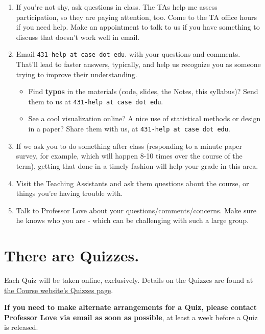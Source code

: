 \documentclass[
]{book}
\providecommand{\tightlist}{%
  \setlength{\itemsep}{0pt}\setlength{\parskip}{0pt}}
\begin{document}
\begin{enumerate}
\def\labelenumi{\arabic{enumi}.}
\tightlist
\item
  If you're not shy, ask questions in class. The TAs help me assess participation, so they are paying attention, too. Come to the TA office hours if you need help. Make an appointment to talk to us if you have something to discuss that doesn't work well in email.
\item
  Email \texttt{431-help\ at\ case\ dot\ edu}. with your questions and comments. That'll lead to faster answers, typically, and help us recognize you as someone trying to improve their understanding.

  \begin{itemize}
  \tightlist
  \item
    Find \textbf{typos} in the materials (code, slides, the Notes, this syllabus)? Send them to us at \texttt{431-help\ at\ case\ dot\ edu}.
  \item
    See a cool visualization online? A nice use of statistical methods or design in a paper? Share them with us, at \texttt{431-help\ at\ case\ dot\ edu}.
  \end{itemize}
\item
  If we ask you to do something after class (responding to a minute paper survey, for example, which will happen 8-10 times over the course of the term), getting that done in a timely fashion will help your grade in this area.
\item
  Visit the Teaching Assistants and ask them questions about the course, or things you're having trouble with.
\item
  Talk to Professor Love about your questions/comments/concerns. Make sure he knows who you are - which can be challenging with such a large group.
\end{enumerate}

\hypertarget{there-are-quizzes.}{%
\section{There are Quizzes.}\label{there-are-quizzes.}}

Each Quiz will be taken online, exclusively. Details on the Quizzes are found at \href{https://github.com/THOMASELOVE/2019-431/tree/master/QUIZZES}{the Course website's Quizzes page}.

\textbf{If you need to make alternate arrangements for a Quiz, please contact Professor Love via email as soon as possible}, at least a week before a Quiz is released.
\end{document}
